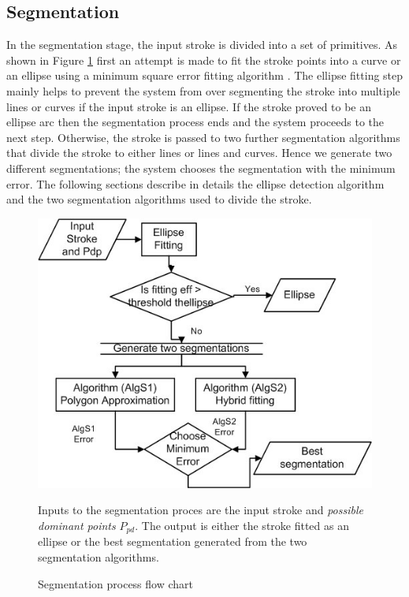 \documentclass[preprint,10pt,5p,twocolumn]{elsarticle}
\begin{document}
\subsection{Segmentation}
\label{seg}
In the segmentation stage, the input stroke is divided into a set of primitives. As shown in Figure \ref{fig:segblock} first an attempt is made to fit the stroke points into a curve or an ellipse using a minimum square error fitting algorithm \cite{ellipsefit}. The ellipse fitting step mainly helps to prevent the system from over segmenting the stroke into multiple lines or curves if the input stroke is an ellipse. If the stroke proved to be an ellipse arc then the segmentation process ends and the system proceeds to the next step. Otherwise, the stroke is passed to two further segmentation algorithms that divide the stroke to either lines or lines and curves. Hence we generate two different segmentations; the system chooses the segmentation with the minimum error. The following sections describe in details the ellipse detection algorithm and the two segmentation algorithms used to divide the stroke. 
 \begin{figure}
	\centering
		\includegraphics[scale=0.48]{images/flowchart.jpg}
	\caption{Segmentation process flow chart} Inputs to the segmentation proces are the input stroke and \textit{possible dominant points} $P_{pd}$. The output is either the stroke fitted as an ellipse or the best segmentation generated from the two segmentation algorithms.   
	\label{fig:segblock}
\end{figure}
\end{document}
